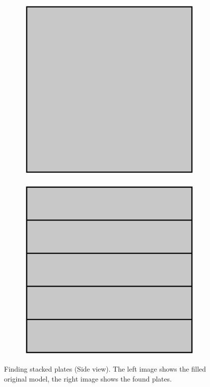 \documentclass[../ClassicThesis.tex]{subfiles}
\begin{document}
\begin{figure}
    \centering
    \begin{subfigure}[t]{0.4\textwidth}
      \centering
      \includegraphics[width=\textwidth]{Images/plates_stackedplates_1.png}
    \end{subfigure}
    \begin{subfigure}[t]{0.4\textwidth}
      \centering
      \includegraphics[width=\textwidth]{Images/plates_stackedplates_2.png}
    \end{subfigure}
    \caption{Finding stacked plates (Side view). The left image shows the filled original model, the right image shows the found plates.}
    \label{fig:staplates}
\end{figure}
\end{document}
